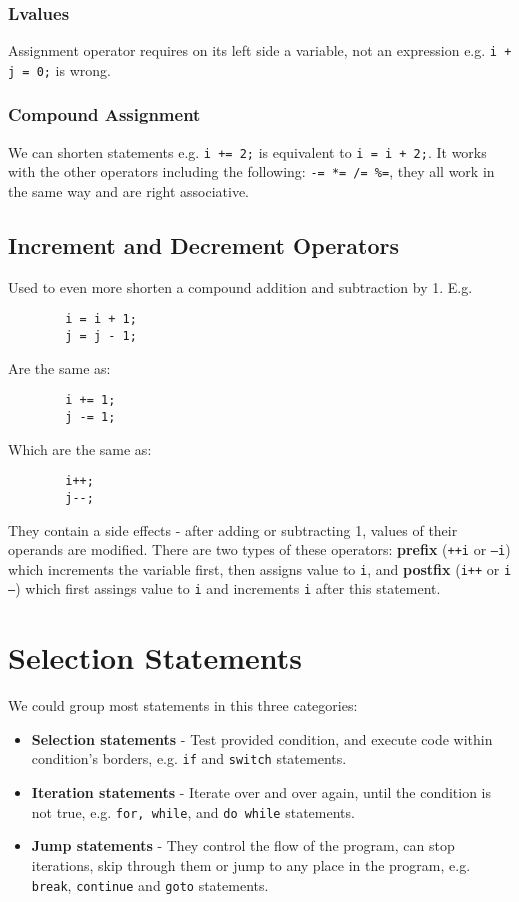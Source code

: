 \documentclass[openany]{book}
\begin{document}
    \subsection*{Lvalues}
    Assignment operator requires on its left side a variable, not an expression e.g. \texttt{i + j = 0;} is wrong.

    \subsection*{Compound Assignment}
    We can shorten statements e.g. \texttt{i += 2;} is equivalent to \texttt{i = i + 2;}. It works with the other operators including the following: \texttt{-= *= /= \%=}, they all work in the same way and are right associative.

    \section{Increment and Decrement Operators}
    Used to even more shorten a compound addition and subtraction by 1. E.g. 
    \begin{lstlisting}
        i = i + 1;
        j = j - 1;
    \end{lstlisting}
    Are the same as:
    \begin{lstlisting}
        i += 1;
        j -= 1;
    \end{lstlisting}
    Which are the same as:
    \begin{lstlisting}
        i++;
        j--;
    \end{lstlisting}

    They contain a side effects - after adding or subtracting 1, values of their operands are modified. There are two types of these operators: \textbf{prefix} (\texttt{++i} or \texttt{---i}) which increments the variable first, then assigns value to \texttt{i}, and \textbf{postfix} (\texttt{i++} or \texttt{i---}) which first assings value to \texttt{i} and increments \texttt{i} after this statement.



    \chapter{Selection Statements}
    We could group most statements in this three categories:
    \begin{itemize}
        \item \textbf{Selection statements} - Test provided condition, and execute code within condition's borders, e.g. \texttt{if} and \texttt{switch} statements.
        \item \textbf{Iteration statements} - Iterate over and over again, until the condition is not true, e.g. \texttt{for, while}, and \texttt{do while} statements.
        \item \textbf{Jump statements} - They control the flow of the program, can stop iterations, skip through them or jump to any place in the program, e.g. \texttt{break},
        \texttt{continue} and \texttt{goto} statements.
    \end{itemize} 
\end{document}
